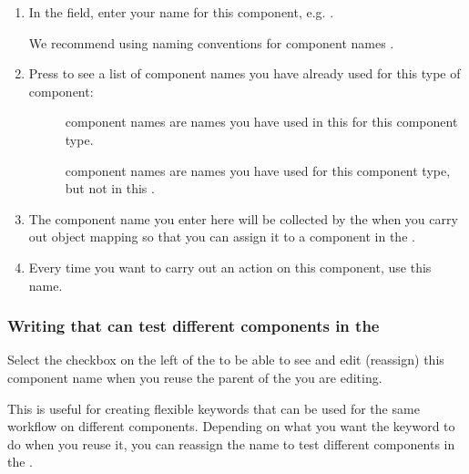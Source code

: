 \begin{enumerate}
\item In the  field, enter your name for this component, e.g. . 

We recommend using naming conventions for component names . 

\item Press  to see a list of component names you have already used for this type of component:

\begin{description}
\item[]{ component names are names you have used in this \gdcase{} for this component type. }
\item []{ component names are names you have used for this component type, but not in this \gdcase{}. }
 \end{description}

\item The component name you enter here will be collected by the \gdomeditor{} when you carry out object mapping so that you can assign it to a component in the \gdaut{}. 

\item Every time you want to carry out an action on this component, use this name. 
\end{enumerate}

\subsubsection{Writing \gdcases{} that can test different components in the \gdaut{}}
\label{TasksCompNamesCheckbox}
Select the checkbox on the left of the \gdcompnamesview{} to be able to see and edit (reassign) this component name when you reuse the parent of the \gdcase{} you are editing. 

This is useful for creating flexible keywords that can be used for the same workflow on different components. Depending on what you want the keyword to do when you reuse it, you can reassign the name to test different components in the \gdaut{}.

